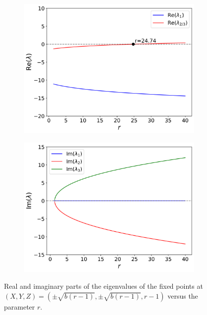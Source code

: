 \documentclass[paper=a4, fontsize=11pt]{scrartcl}
\numberwithin{equation}{section}		%
\numberwithin{figure}{section}			%
\numberwithin{table}{section}				%
\begin{document}
\begin{figure}[hbt!]
	\centering
	
	\begin{subfigure}[b]{0.49\textwidth}
		\centering
		\includegraphics[width=\textwidth]{media/hopf_eigs_real.png}
		\caption{}
		\label{fig:sub1}
	\end{subfigure}
	\hfill
	\begin{subfigure}[b]{0.49\textwidth}
		\centering
		\includegraphics[width=\textwidth]{media/hopf_eigs_imag.png}
		\caption{}
		\label{fig:sub2}
	\end{subfigure}
	
	\caption{Real and imaginary parts of the eigenvalues of the fixed points at $(X,Y,Z) = (\pm\sqrt{b(r-1)},\pm\sqrt{b(r-1)},r-1)$ versus the parameter $r$.}
	\label{fig:hopf_eigs}
\end{figure}
\end{document}
